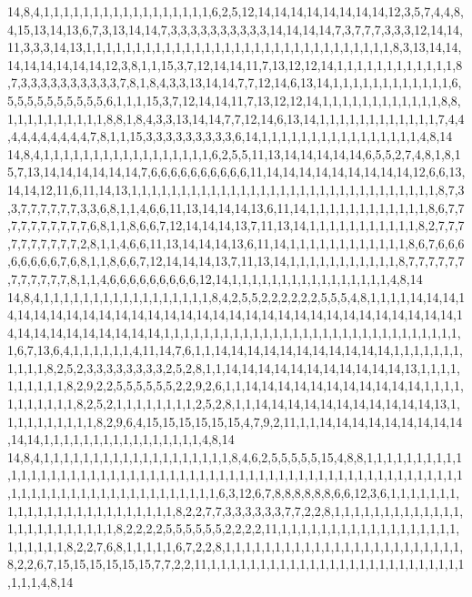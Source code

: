 14,8,4,1,1,1,1,1,1,1,1,1,1,1,1,1,1,1,1,1,6,2,5,12,14,14,14,14,14,14,14,14,12,3,5,7,4,4,8,4,15,13,14,13,6,7,3,13,14,14,7,3,3,3,3,3,3,3,3,3,3,14,14,14,14,7,3,7,7,7,3,3,3,12,14,14,11,3,3,3,14,13,1,1,1,1,1,1,1,1,1,1,1,1,1,1,1,1,1,1,1,1,1,1,1,1,1,1,1,1,1,1,1,8,3,13,14,14,14,14,14,14,14,14,12,3,8,1,1,15,3,7,12,14,14,11,7,13,12,12,14,1,1,1,1,1,1,1,1,1,1,1,1,8,7,3,3,3,3,3,3,3,3,3,3,7,8,1,8,4,3,3,13,14,14,7,7,12,14,6,13,14,1,1,1,1,1,1,1,1,1,1,1,1,6,5,5,5,5,5,5,5,5,5,5,6,1,1,1,15,3,7,12,14,14,11,7,13,12,12,14,1,1,1,1,1,1,1,1,1,1,1,1,8,8,1,1,1,1,1,1,1,1,1,1,8,8,1,8,4,3,3,13,14,14,7,7,12,14,6,13,14,1,1,1,1,1,1,1,1,1,1,1,1,7,4,4,4,4,4,4,4,4,4,4,7,8,1,1,15,3,3,3,3,3,3,3,3,3,6,14,1,1,1,1,1,1,1,1,1,1,1,1,1,1,1,1,4,8,14
14,8,4,1,1,1,1,1,1,1,1,1,1,1,1,1,1,1,1,1,6,2,5,5,11,13,14,14,14,14,14,6,5,5,2,7,4,8,1,8,15,7,13,14,14,14,14,14,14,7,6,6,6,6,6,6,6,6,6,6,11,14,14,14,14,14,14,14,14,14,12,6,6,13,14,14,12,11,6,11,14,13,1,1,1,1,1,1,1,1,1,1,1,1,1,1,1,1,1,1,1,1,1,1,1,1,1,1,1,1,1,1,1,8,7,3,3,7,7,7,7,7,7,3,3,6,8,1,1,4,6,6,11,13,14,14,14,13,6,11,14,1,1,1,1,1,1,1,1,1,1,1,1,8,6,7,7,7,7,7,7,7,7,7,7,6,8,1,1,8,6,6,7,12,14,14,14,13,7,11,13,14,1,1,1,1,1,1,1,1,1,1,1,8,2,7,7,7,7,7,7,7,7,7,7,2,8,1,1,4,6,6,11,13,14,14,14,13,6,11,14,1,1,1,1,1,1,1,1,1,1,1,1,8,6,7,6,6,6,6,6,6,6,6,7,6,8,1,1,8,6,6,7,12,14,14,14,13,7,11,13,14,1,1,1,1,1,1,1,1,1,1,1,8,7,7,7,7,7,7,7,7,7,7,7,7,8,1,1,4,6,6,6,6,6,6,6,6,6,12,14,1,1,1,1,1,1,1,1,1,1,1,1,1,1,1,1,4,8,14
14,8,4,1,1,1,1,1,1,1,1,1,1,1,1,1,1,1,1,1,8,4,2,5,5,2,2,2,2,2,2,5,5,5,4,8,1,1,1,1,14,14,14,14,14,14,14,14,14,14,14,14,14,14,14,14,14,14,14,14,14,14,14,14,14,14,14,14,14,14,14,14,14,14,14,14,14,14,14,14,14,1,1,1,1,1,1,1,1,1,1,1,1,1,1,1,1,1,1,1,1,1,1,1,1,1,1,1,1,1,1,1,6,7,13,6,4,1,1,1,1,1,1,4,11,14,7,6,1,1,14,14,14,14,14,14,14,14,14,14,14,1,1,1,1,1,1,1,1,1,1,1,8,2,5,2,3,3,3,3,3,3,3,3,2,5,2,8,1,1,14,14,14,14,14,14,14,14,14,14,14,13,1,1,1,1,1,1,1,1,1,1,8,2,9,2,2,5,5,5,5,5,5,2,2,9,2,6,1,1,14,14,14,14,14,14,14,14,14,14,14,1,1,1,1,1,1,1,1,1,1,1,8,2,5,2,1,1,1,1,1,1,1,1,2,5,2,8,1,1,14,14,14,14,14,14,14,14,14,14,14,13,1,1,1,1,1,1,1,1,1,1,8,2,9,6,4,15,15,15,15,15,15,4,7,9,2,11,1,1,14,14,14,14,14,14,14,14,14,14,14,1,1,1,1,1,1,1,1,1,1,1,1,1,1,1,1,4,8,14
14,8,4,1,1,1,1,1,1,1,1,1,1,1,1,1,1,1,1,1,1,1,8,4,6,2,5,5,5,5,5,15,4,8,8,1,1,1,1,1,1,1,1,1,1,1,1,1,1,1,1,1,1,1,1,1,1,1,1,1,1,1,1,1,1,1,1,1,1,1,1,1,1,1,1,1,1,1,1,1,1,1,1,1,1,1,1,1,1,1,1,1,1,1,1,1,1,1,1,1,1,1,1,1,1,1,1,1,1,1,1,1,6,3,12,6,7,8,8,8,8,8,8,6,6,12,3,6,1,1,1,1,1,1,1,1,1,1,1,1,1,1,1,1,1,1,1,1,1,1,1,1,8,2,2,7,7,3,3,3,3,3,3,7,7,2,2,8,1,1,1,1,1,1,1,1,1,1,1,1,1,1,1,1,1,1,1,1,1,1,1,1,8,2,2,2,2,5,5,5,5,5,5,2,2,2,2,11,1,1,1,1,1,1,1,1,1,1,1,1,1,1,1,1,1,1,1,1,1,1,1,1,8,2,2,7,6,8,1,1,1,1,1,6,7,2,2,8,1,1,1,1,1,1,1,1,1,1,1,1,1,1,1,1,1,1,1,1,1,1,1,1,8,2,2,6,7,15,15,15,15,15,15,7,7,2,2,11,1,1,1,1,1,1,1,1,1,1,1,1,1,1,1,1,1,1,1,1,1,1,1,1,1,1,1,1,1,4,8,14
